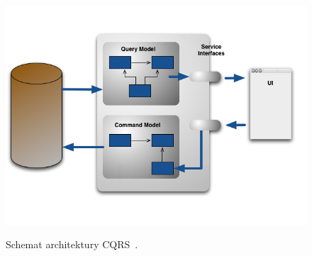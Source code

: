\begin{figure}[!ht]
 \begin{center}
  \scalebox{0.5}
  {
   \includegraphics{figures/generated_app_type/cqrs.png}
  }
 \end{center}
 \caption{Schemat architektury CQRS~\cite{cqrs_fowler}.}
 \label{fig:cqrs}
\end{figure}
